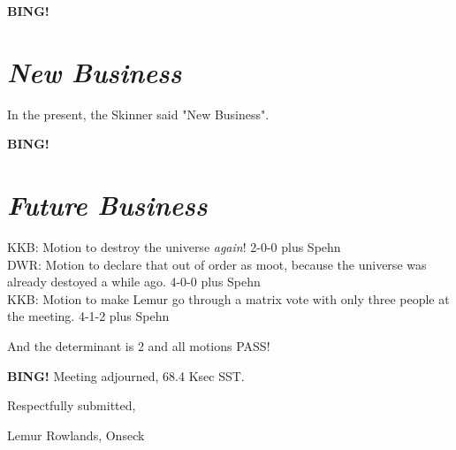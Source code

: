 \documentclass[10pt]{article}
\newcommand{\bing}{{\bf BING!} }
\newcommand{\goto}[1]{\bing \vskip 12pt \section*{{\em{#1}}}}
\newcommand{\ps}{ plus Spehn\xspace}
\newcommand{\onseck}{Lemur Rowlands, Onseck}
\begin{document}
\goto{New Business}

In the present, the Skinner said "New Business".

\goto{Future Business}

KKB: Motion to destroy the universe \emph{again}! 2-0-0\ps
\\ DWR: Motion to declare that out of order as moot, because
the universe was already destoyed a while ago. 4-0-0\ps 
\\ KKB: Motion to make Lemur go through a matrix vote with
only three people at the meeting. 4-1-2\ps

And the determinant is 2 and all motions PASS!

\bing
\noindent
Meeting adjourned, 68.4 Ksec SST.

\vspace{18pt}

\centerline{Respectfully submitted,}
\centerline{\onseck}
\end{document}
